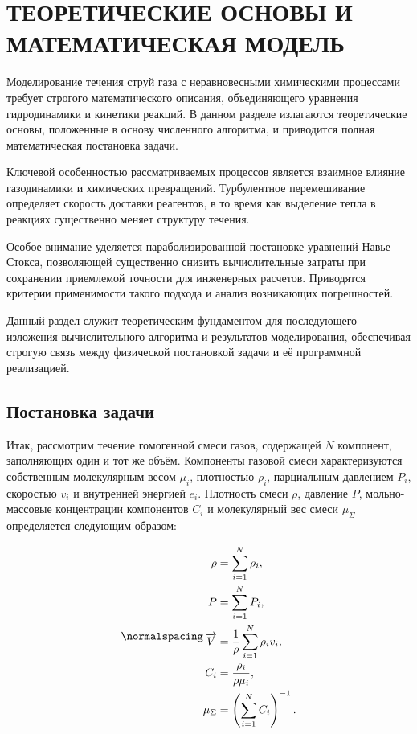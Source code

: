 \section{ТЕОРЕТИЧЕСКИЕ ОСНОВЫ И МАТЕМАТИЧЕСКАЯ МОДЕЛЬ}

Моделирование течения струй газа с неравновесными химическими процессами требует строгого математического описания, объединяющего уравнения гидродинамики и кинетики реакций. В данном разделе излагаются теоретические основы, положенные в основу численного алгоритма, и приводится полная математическая постановка задачи.

Ключевой особенностью рассматриваемых процессов является взаимное влияние газодинамики и химических превращений. Турбулентное перемешивание определяет скорость доставки реагентов, в то время как выделение тепла в реакциях существенно меняет структуру течения.

Особое внимание уделяется параболизированной постановке уравнений Навье-Стокса, позволяющей существенно снизить вычислительные затраты при сохранении приемлемой точности для инженерных расчетов. Приводятся критерии применимости такого подхода и анализ возникающих погрешностей.

Данный раздел служит теоретическим фундаментом для последующего изложения вычислительного алгоритма и результатов моделирования, обеспечивая строгую связь между физической постановкой задачи и её программной реализацией.

\subsection{Постановка задачи}

Итак, рассмотрим течение гомогенной смеси газов, содержащей $N$ компонент, заполняющих один и тот же объём. Компоненты газовой смеси характеризуются собственным молекулярным весом $\mu_i$, плотностью $\rho_i$, парциальным давлением $P_i$, скоростью $v_i$ и внутренней энергией $e_i$. Плотность смеси $\rho$, давление $P$, мольно-массовые концентрации компонентов $C_i$ и молекулярный вес смеси $\mu_\Sigma$ определяется следующим образом:

\begin{equation}
\normalspacing
\begin{split}
\rho &= \sum_{i = 1}^{N}\rho_i, \\
P &= \sum_{i = 1}^{N} P_i, \\
\overrightarrow{V} &= \frac{1}{\rho}\sum_{i = 1}^N\rho_i v_i, \\
C_i &= \frac{\rho_i}{\rho\mu_i}, \\
\mu_\Sigma &= \left(\sum_{i = 1}^{N} C_i\right)^{-1}.
\end{split}
\end{equation}

